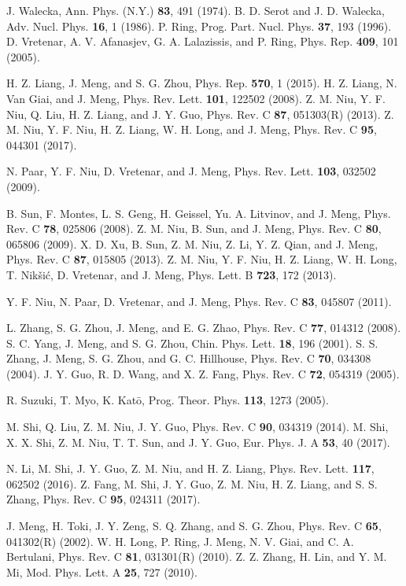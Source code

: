 \documentclass[twocolumn,prc,preprintnumbers,superscriptaddress,floatfix,showpacs]{revtex4}
\begin{document}
\begin{thebibliography}{99}
 J. Walecka, Ann. Phys. (N.Y.) \textbf{83}, 491 (1974).
 B. D. Serot and J. D. Walecka, Adv. Nucl. Phys. \textbf{16}, 1 (1986).
 P. Ring, Prog. Part. Nucl. Phys. \textbf{37}, 193 (1996).
 D. Vretenar, A. V. Afanasjev, G. A. Lalazissis, and P. Ring, Phys. Rep. \textbf{409}, 101 (2005).

 H. Z. Liang, J. Meng, and S. G. Zhou, Phys. Rep. \textbf{570}, 1 (2015).
 H. Z. Liang, N. Van Giai, and J. Meng, Phys. Rev. Lett. \textbf{101}, 122502 (2008).
 Z. M. Niu, Y. F. Niu, Q. Liu, H. Z. Liang, and J. Y. Guo, Phys. Rev. C \textbf{87}, 051303(R) (2013).
 Z. M. Niu, Y. F. Niu, H. Z. Liang, W. H. Long, and J. Meng, Phys. Rev. C \textbf{95}, 044301 (2017).

 N. Paar, Y. F. Niu, D. Vretenar, and J. Meng, Phys. Rev. Lett. \textbf{103}, 032502 (2009).

 B. Sun, F. Montes, L. S. Geng, H. Geissel, Yu. A. Litvinov, and J. Meng, Phys. Rev. C \textbf{78}, 025806 (2008).
 Z. M. Niu, B. Sun, and J. Meng, Phys. Rev. C \textbf{80}, 065806 (2009).
 X. D. Xu, B. Sun, Z. M. Niu, Z. Li, Y. Z. Qian, and J. Meng, Phys. Rev. C \textbf{87}, 015805 (2013).
 Z. M. Niu, Y. F. Niu, H. Z. Liang, W. H. Long, T. Nik\v{s}i\'{c}, D. Vretenar, and J. Meng, Phys. Lett. B \textbf{723}, 172 (2013).

 Y. F. Niu, N. Paar, D. Vretenar, and J. Meng, Phys. Rev. C \textbf{83}, 045807 (2011).

 L. Zhang, S. G. Zhou, J. Meng, and E. G. Zhao, Phys. Rev. C \textbf{77}, 014312 (2008).
 S. C. Yang, J. Meng, and S. G. Zhou, Chin. Phys. Lett. \textbf{18}, 196 (2001).
 S. S. Zhang, J. Meng, S. G. Zhou, and G. C. Hillhouse, Phys. Rev. C \textbf{70}, 034308 (2004).
 J. Y. Guo, R. D. Wang, and X. Z. Fang, Phys. Rev. C \textbf{72}, 054319 (2005).  %

 R. Suzuki, T. Myo, K. Kat\={o}, Prog. Theor. Phys. \textbf{113}, 1273 (2005).

 M. Shi, Q. Liu, Z. M. Niu, J. Y. Guo, Phys. Rev. C \textbf{90}, 034319 (2014).
 M. Shi, X. X. Shi, Z. M. Niu, T. T. Sun, and J. Y. Guo, Eur. Phys. J. A \textbf{53}, 40 (2017). %

 N. Li, M. Shi, J. Y. Guo, Z. M. Niu, and H. Z. Liang, Phys. Rev. Lett. \textbf{117}, 062502 (2016).
 Z. Fang, M. Shi, J. Y. Guo, Z. M. Niu, H. Z. Liang, and S. S. Zhang, Phys. Rev. C \textbf{95}, 024311 (2017). %

 J. Meng, H. Toki, J. Y. Zeng, S. Q. Zhang, and S. G. Zhou, Phys. Rev. C \textbf{65}, 041302(R) (2002). %
 W. H. Long, P. Ring, J. Meng, N. V. Giai, and C. A. Bertulani, Phys. Rev. C \textbf{81}, 031301(R) (2010). %
 Z. Z. Zhang, H. Lin, and Y. M. Mi, Mod. Phys. Lett. A \textbf{25}, 727 (2010).


\end{thebibliography}
\end{document}
